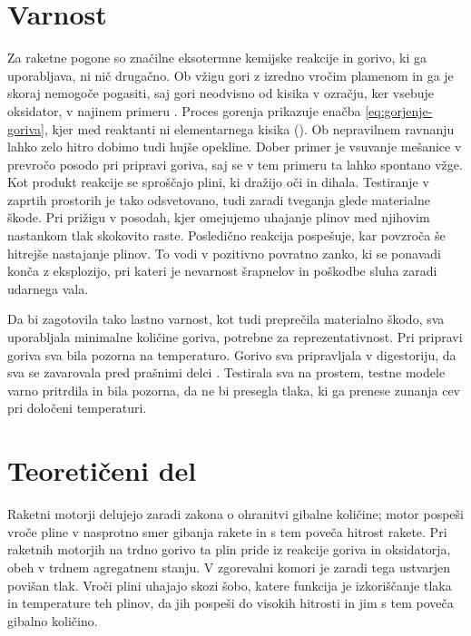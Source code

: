 \documentclass[titlepage, a4paper, twoside, final, 12pt]{article}
\begin{document}
		\section{Varnost}
		Za raketne pogone so značilne eksotermne kemijske reakcije in gorivo, ki ga uporabljava, ni nič drugačno. Ob vžigu gori z izredno vročim plamenom in
		ga je skoraj nemogoče pogasiti, saj gori neodvisno od kisika v ozračju, ker vsebuje oksidator, v najinem primeru .
		Proces gorenja prikazuje enačba \ref{eq:gorjenje-goriva}, kjer med reaktanti ni elementarnega kisika ().
		Ob nepravilnem ravnanju lahko zelo hitro dobimo tudi hujše opekline. Dober primer je vsuvanje mešanice v prevročo posodo pri pripravi goriva, saj se v tem primeru ta lahko spontano vžge.
		Kot produkt reakcije se sproščajo plini, ki dražijo oči in dihala. Testiranje v zaprtih prostorih je tako odsvetovano, tudi zaradi tveganja glede materialne škode.
		Pri prižigu v posodah, kjer omejujemo uhajanje plinov med njihovim nastankom tlak skokovito raste. Posledično reakcija pospešuje, kar povzroča še hitrejše nastajanje plinov.
		To vodi v pozitivno povratno zanko, ki se ponavadi konča z eksplozijo, pri kateri je nevarnost šrapnelov in poškodbe sluha zaradi udarnega vala.


		Da bi zagotovila tako lastno varnost, kot tudi preprečila materialno škodo, sva uporabljala minimalne količine goriva, potrebne za reprezentativnost. Pri pripravi goriva sva
		bila pozorna na temperaturo. Gorivo sva pripravljala v digestoriju, da sva se
		zavarovala pred prašnimi delci . Testirala sva na prostem, testne modele
		varno pritrdila in bila pozorna, da ne bi presegla tlaka, ki ga prenese zunanja cev pri določeni temperaturi.
		

		\section{Teoretičeni del}
		Raketni motorji delujejo zaradi zakona o ohranitvi gibalne količine; motor pospeši vroče pline v nasprotno smer gibanja rakete in s tem poveča hitrost rakete.
		Pri raketnih motorjih na trdno gorivo ta plin pride iz reakcije goriva in oksidatorja, obeh v trdnem agregatnem stanju. V zgorevalni komori je zaradi tega ustvarjen povišan tlak.
		Vroči plini uhajajo skozi šobo, katere funkcija je izkoriščanje tlaka in temperature teh plinov, da jih pospeši do visokih hitrosti in jim s tem poveča gibalno količino.
\end{document}
